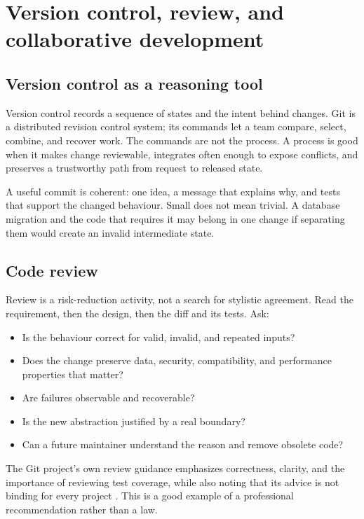 \chapter{Version control, review, and collaborative development}

\section{Version control as a reasoning tool}
Version control records a sequence of states and the intent behind changes. Git
is a distributed revision control system; its commands let a team compare,
select, combine, and recover work. The commands are not the process. A process
is good when it makes change reviewable, integrates often enough to expose
conflicts, and preserves a trustworthy path from request to released state.

A useful commit is coherent: one idea, a message that explains why, and tests
that support the changed behaviour. Small does not mean trivial. A database
migration and the code that requires it may belong in one change if separating
them would create an invalid intermediate state.

\section{Code review}
Review is a risk-reduction activity, not a search for stylistic agreement. Read
the requirement, then the design, then the diff and its tests. Ask:

\begin{itemize}
  \item Is the behaviour correct for valid, invalid, and repeated inputs?
  \item Does the change preserve data, security, compatibility, and performance
        properties that matter?
  \item Are failures observable and recoverable?
  \item Is the new abstraction justified by a real boundary?
  \item Can a future maintainer understand the reason and remove obsolete code?
\end{itemize}

The Git project's own review guidance emphasizes correctness, clarity, and the
importance of reviewing test coverage, while also noting that its advice is not
binding for every project \cite{git2026review}. This is a good example of a
professional recommendation rather than a law.

